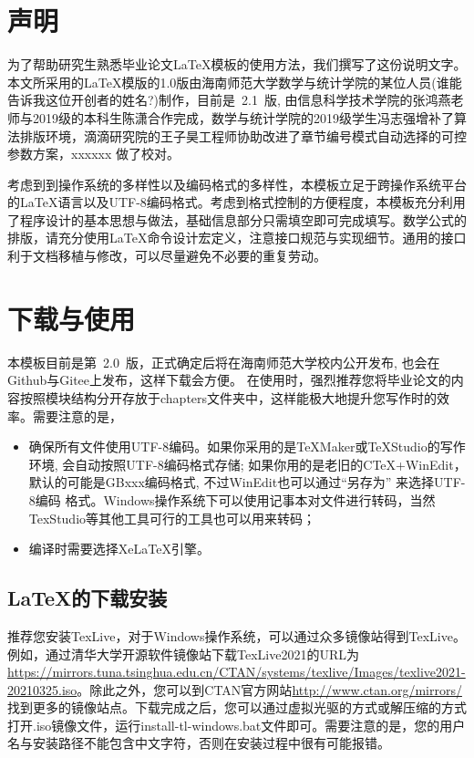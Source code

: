 \introduction

\section*{声明}
为了帮助研究生熟悉毕业论文{\LaTeX{}}模板的使用方法，我们撰写了这份说明文字。本文所采用的{\LaTeX{}}模版的1.0版由海南师范大学数学与统计学院的某位人员(谁能告诉我这位开创者的姓名?)制作，目前是~2.1~版, 由信息科学技术学院的张鸿燕老师与2019级的本科生陈潇合作完成，数学与统计学院的2019级学生冯志强增补了算法排版环境，滴滴研究院的王子昊工程师协助改进了章节编号模式自动选择的可控参数方案，xxxxxx 做了校对。

考虑到到操作系统的多样性以及编码格式的多样性，本模板立足于跨操作系统平台的{\LaTeX{}}语言以及UTF-8编码格式。考虑到格式控制的方便程度，本模板充分利用了程序设计的基本思想与做法，基础信息部分只需填空即可完成填写。数学公式的排版，请充分使用{\LaTeX{}}命令设计宏定义，注意接口规范与实现细节。通用的接口利于文档移植与修改，可以尽量避免不必要的重复劳动。

\section*{下载与使用}

本模板目前是第~2.0~版，正式确定后将在海南师范大学校内公开发布, 也会在Github与Gitee上发布，这样下载会方便。
在使用时，强烈推荐您将毕业论文的内容按照模块结构分开存放于chapters文件夹中，这样能极大地提升您写作时的效率。需要注意的是，
\begin{itemize}
\item 确保所有文件使用UTF-8编码。如果你采用的是TeXMaker或TeXStudio的写作环境, 会自动按照UTF-8编码格式存储;
	如果你用的是老旧的CTeX+WinEdit，默认的可能是GBxxx编码格式, 不过WinEdit也可以通过“另存为” 来选择UTF-8编码
	格式。Windows操作系统下可以使用记事本对文件进行转码，当然TexStudio等其他工具可行的工具也可以用来转码；
\item 编译时需要选择XeLaTeX引擎。
\end{itemize}

\subsection*{\LaTeX{}的下载安装}
推荐您安装TexLive，对于Windows操作系统，可以通过众多镜像站得到TexLive。例如，通过清华大学开源软件镜像站下载TexLive2021的URL为\url{https://mirrors.tuna.tsinghua.edu.cn/CTAN/systems/texlive/Images/texlive2021-20210325.iso}。除此之外，您可以到CTAN官方网站\url{http://www.ctan.org/mirrors/}找到更多的镜像站点。下载完成之后，您可以通过虚拟光驱的方式或解压缩的方式打开.iso镜像文件，运行install-tl-windows.bat文件即可。需要注意的是，您的用户名与安装路径不能包含中文字符，否则在安装过程中很有可能报错。

